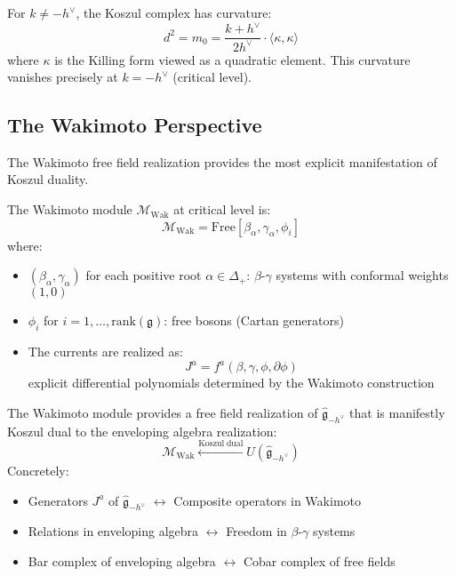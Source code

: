 \begin{definition}
For $k \neq -h^\vee$, the Koszul complex has curvature:
\begin{equation}
d^2 = m_0 = \frac{k+h^\vee}{2h^\vee} \cdot \langle \kappa, \kappa \rangle
\end{equation}
where $\kappa$ is the Killing form viewed as a quadratic element. This curvature vanishes precisely at $k = -h^\vee$ (critical level).
\end{definition}

\subsection{The Wakimoto Perspective}

The Wakimoto free field realization provides the most explicit manifestation of Koszul duality.

\begin{definition}\label{def:wakimoto}
The Wakimoto module $\mathcal{M}_{\mathrm{Wak}}$ at critical level is:
\begin{equation}
\mathcal{M}_{\mathrm{Wak}} = \mathrm{Free}[\beta_\alpha, \gamma_\alpha, \phi_i]
\end{equation}
where:
\begin{itemize}
\item $(\beta_\alpha, \gamma_\alpha)$ for each positive root $\alpha \in \Delta_+$: $\beta$-$\gamma$ systems with conformal weights $(1, 0)$
\item $\phi_i$ for $i = 1,\ldots,\mathrm{rank}(\mathfrak{g})$: free bosons (Cartan generators)
\item The currents are realized as:
\begin{equation}
J^a = f^a(\beta, \gamma, \phi, \partial\phi)
\end{equation}
explicit differential polynomials determined by the Wakimoto construction
\end{itemize}
\end{definition}

\begin{theorem}\label{thm:wakimoto-koszul}
The Wakimoto module provides a free field realization of $\widehat{\mathfrak{g}}_{-h^\vee}$ that is manifestly Koszul dual to the enveloping algebra realization:
\begin{equation}
\mathcal{M}_{\mathrm{Wak}} \xleftarrow{\mathrm{Koszul\;dual}} U(\widehat{\mathfrak{g}}_{-h^\vee})
\end{equation}
Concretely:
\begin{itemize}
\item Generators $J^a$ of $\widehat{\mathfrak{g}}_{-h^\vee}$ $\leftrightarrow$ Composite operators in Wakimoto
\item Relations in enveloping algebra $\leftrightarrow$ Freedom in $\beta$-$\gamma$ systems
\item Bar complex of enveloping algebra $\leftrightarrow$ Cobar complex of free fields
\end{itemize}
\end{theorem}

